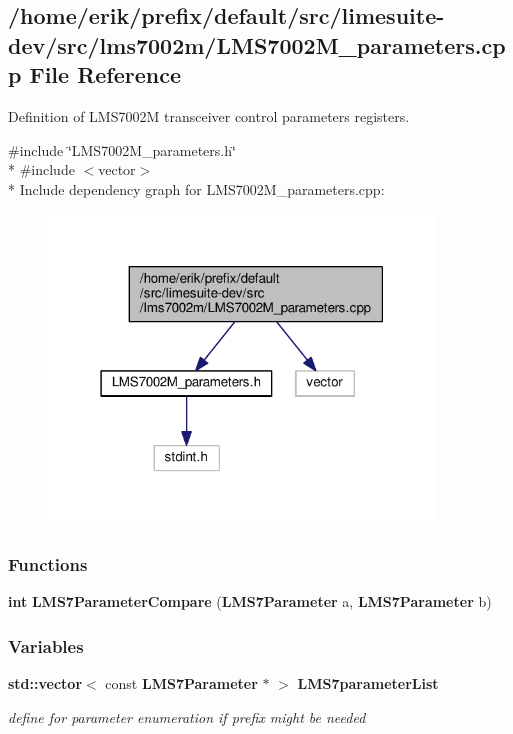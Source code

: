 \subsection{/home/erik/prefix/default/src/limesuite-\/dev/src/lms7002m/\+L\+M\+S7002\+M\+\_\+parameters.cpp File Reference}
\label{LMS7002M__parameters_8cpp}


Definition of L\+M\+S7002M transceiver control parameters registers.  


{\ttfamily \#include \char`\"{}L\+M\+S7002\+M\+\_\+parameters.\+h\char`\"{}}\\*
{\ttfamily \#include $<$vector$>$}\\*
Include dependency graph for L\+M\+S7002\+M\+\_\+parameters.\+cpp\+:
\nopagebreak
\begin{figure}[H]
\begin{center}
\leavevmode
\includegraphics[width=291pt]{de/d3a/LMS7002M__parameters_8cpp__incl}
\end{center}
\end{figure}
\subsubsection*{Functions}
\begin{DoxyCompactItemize}
\item 
{\bf int} {\bf L\+M\+S7\+Parameter\+Compare} ({\bf L\+M\+S7\+Parameter} a, {\bf L\+M\+S7\+Parameter} b)
\end{DoxyCompactItemize}
\subsubsection*{Variables}
\begin{DoxyCompactItemize}
\item 
{\bf std\+::vector}$<$ const {\bf L\+M\+S7\+Parameter} $\ast$ $>$ {\bf L\+M\+S7parameter\+List}
\begin{DoxyCompactList}\small\item\em define for parameter enumeration if prefix might be needed \end{DoxyCompactList}\end{DoxyCompactItemize}


